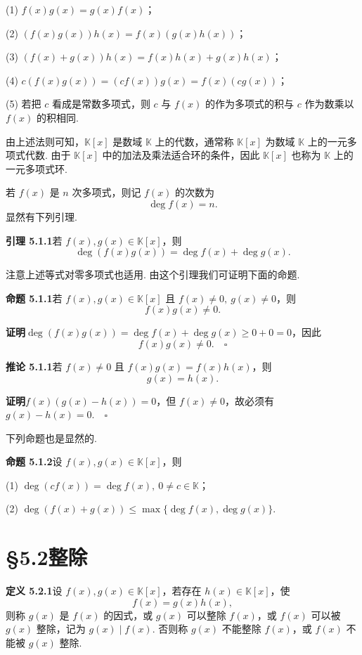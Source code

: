 \documentclass[UTF8,12pt,a4paper,fontset=fandol]{ctexart}
\begin{document}
(1) $f(x)g(x)=g(x)f(x)$；

(2) $(f(x)g(x))h(x)=f(x)(g(x)h(x))$；

(3) $(f(x)+g(x))h(x)=f(x)h(x)+g(x)h(x)$；

(4) $c(f(x)g(x))=(cf(x))g(x)=f(x)(cg(x))$；

(5) 若把 $c$ 看成是常数多项式，则 $c$ 与 $f(x)$ 的作为多项式的积与 $c$ 作为数乘以 $f(x)$ 的积相同.

由上述法则可知，$\mathbb{K}[x]$ 是数域 $\mathbb{K}$ 上的代数，通常称 $\mathbb{K}[x]$ 为数域 $\mathbb{K}$ 上的一元多项式代数. 由于 $\mathbb{K}[x]$ 中的加法及乘法适合环的条件，因此 $\mathbb{K}[x]$ 也称为 $\mathbb{K}$ 上的一元多项式环.

若 $f(x)$ 是 $n$ 次多项式，则记 $f(x)$ 的次数为
\[
\deg f(x)=n.
\]
显然有下列引理.

\noindent\textbf{引理 5.1.1}\quad 若 $f(x),g(x)\in\mathbb{K}[x]$，则
\[
\deg(f(x)g(x))=\deg f(x)+\deg g(x).
\]

注意上述等式对零多项式也适用. 由这个引理我们可证明下面的命题.

\noindent\textbf{命题 5.1.1}\quad 若 $f(x),g(x)\in\mathbb{K}[x]$ 且 $f(x)\neq 0,\ g(x)\neq 0$，则
\[
f(x)g(x)\neq 0.
\]

\noindent\textbf{证明}\quad $\deg(f(x)g(x))=\deg f(x)+\deg g(x)\geq 0+0=0$，因此
\[
f(x)g(x)\neq 0.\quad \square
\]

\noindent\textbf{推论 5.1.1}\quad 若 $f(x)\neq 0$ 且 $f(x)g(x)=f(x)h(x)$，则
\[
g(x)=h(x).
\]

\noindent\textbf{证明}\quad $f(x)(g(x)-h(x))=0$，但 $f(x)\neq 0$，故必须有 $g(x)-h(x)=0.\quad \square$

下列命题也是显然的.

\noindent\textbf{命题 5.1.2}\quad 设 $f(x),g(x)\in\mathbb{K}[x]$，则

(1) $\deg(cf(x))=\deg f(x),\ 0\neq c\in\mathbb{K}$；

(2) $\deg(f(x)+g(x))\leq \max\{\deg f(x),\deg g(x)\}$.

\section*{§5.2\quad 整除}

\noindent\textbf{定义 5.2.1}\quad 设 $f(x),g(x)\in\mathbb{K}[x]$，若存在 $h(x)\in\mathbb{K}[x]$，使
\[
f(x)=g(x)h(x),
\]
则称 $g(x)$ 是 $f(x)$ 的因式，或 $g(x)$ 可以整除 $f(x)$，或 $f(x)$ 可以被 $g(x)$ 整除，记为 $g(x)\mid f(x)$. 否则称 $g(x)$ 不能整除 $f(x)$，或 $f(x)$ 不能被 $g(x)$ 整除.
\end{document}

